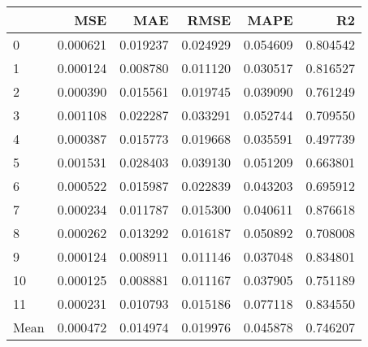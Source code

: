 \begin{tabular}{lrrrrr}
\toprule
 & MSE & MAE & RMSE & MAPE & R2 \\
\midrule
0 & 0.000621 & 0.019237 & 0.024929 & 0.054609 & 0.804542 \\
1 & 0.000124 & 0.008780 & 0.011120 & 0.030517 & 0.816527 \\
2 & 0.000390 & 0.015561 & 0.019745 & 0.039090 & 0.761249 \\
3 & 0.001108 & 0.022287 & 0.033291 & 0.052744 & 0.709550 \\
4 & 0.000387 & 0.015773 & 0.019668 & 0.035591 & 0.497739 \\
5 & 0.001531 & 0.028403 & 0.039130 & 0.051209 & 0.663801 \\
6 & 0.000522 & 0.015987 & 0.022839 & 0.043203 & 0.695912 \\
7 & 0.000234 & 0.011787 & 0.015300 & 0.040611 & 0.876618 \\
8 & 0.000262 & 0.013292 & 0.016187 & 0.050892 & 0.708008 \\
9 & 0.000124 & 0.008911 & 0.011146 & 0.037048 & 0.834801 \\
10 & 0.000125 & 0.008881 & 0.011167 & 0.037905 & 0.751189 \\
11 & 0.000231 & 0.010793 & 0.015186 & 0.077118 & 0.834550 \\
Mean & 0.000472 & 0.014974 & 0.019976 & 0.045878 & 0.746207 \\
\bottomrule
\end{tabular}
